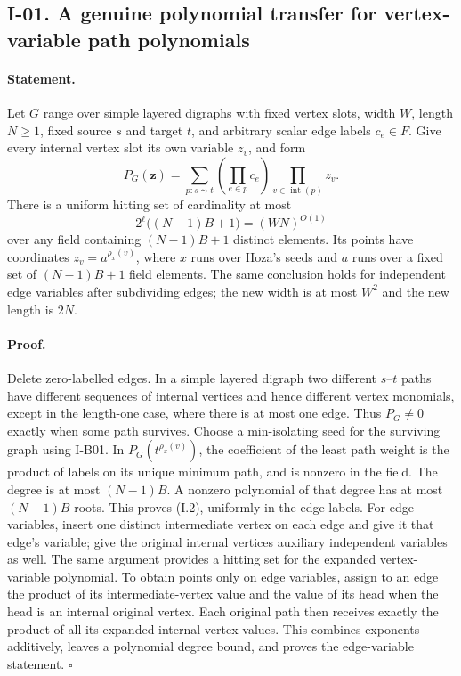 \documentclass[11pt,a4paper]{article}
\theoremstyle{definition}\newtheorem{definition}{Definition}
\begin{document}
\subsection{I-01. A genuine polynomial transfer for vertex-variable path polynomials}
\label{I-01}

\paragraph{Statement.}
Let $G$ range over simple layered digraphs with fixed vertex slots,
width $W$, length $N\ge1$, fixed source $s$ and target $t$, and arbitrary
scalar edge labels $c_e\in F$.  Give every internal vertex slot its own
variable $z_v$, and form
\[
 P_G(\mathbf z)=\sum_{p:s\leadsto t}\left(\prod_{e\in p}c_e\right)
                        \prod_{v\in\operatorname{int}(p)}z_v.
\]
There is a uniform hitting set of cardinality at most
\[
 2^{\ell}\bigl((N-1)B+1\bigr)=(WN)^{O(1)}
\tag{I.2}
\]
over any field containing $(N-1)B+1$ distinct elements.  Its points have
coordinates $z_v=a^{\rho_x(v)}$, where $x$ runs over Hoza's seeds and
$a$ runs over a fixed set of $(N-1)B+1$ field elements.  The same conclusion
holds for independent edge variables after subdividing edges; the new
width is at most $W^2$ and the new length is $2N$.

\paragraph{Proof.}
Delete zero-labelled edges.  In a simple layered digraph two different
$s$--$t$ paths have different sequences of internal vertices and hence
different vertex monomials, except in the length-one case, where there
is at most one edge.  Thus $P_G\ne0$ exactly when some path survives.
Choose a min-isolating seed for the surviving graph using I-B01.  In
$P_G(t^{\rho_x(v)})$, the coefficient of the least path weight is the
product of labels on its unique minimum path, and is nonzero in the
field.  The degree is at most $(N-1)B$.  A nonzero polynomial of that
degree has at most $(N-1)B$ roots.  This proves (I.2), uniformly in the
edge labels.  For edge variables, insert one distinct intermediate
vertex on each edge and give it that edge's variable; give the original
internal vertices auxiliary independent variables as well.  The same
argument provides a hitting set for the expanded vertex-variable
polynomial.  To obtain points only on edge variables, assign to an edge
the product of its intermediate-vertex value and the value of its head
when the head is an internal original vertex.  Each original path then
receives exactly the product of all its expanded internal-vertex values.
This combines exponents additively, leaves a polynomial degree bound,
and proves the edge-variable statement. \hfill$\square$
\end{document}
